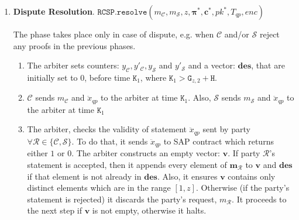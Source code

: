 \begin{enumerate}
\begin{enumerate}
\end{enumerate}

\

\item \textbf{Dispute Resolution}.\label{RCSP::Dispute-Resolution} $\mathtt{RCSP}.\mathtt{resolve}(m_{\scriptscriptstyle \mathcal{C}},m_{\scriptscriptstyle \mathcal{S}},z, {\bm{\pi}}^{\scriptscriptstyle *}, {\bm{c}}^{\scriptscriptstyle *},pk^{\scriptscriptstyle*}, T_{\scriptscriptstyle qp},enc)$



 The phase takes place only in  case of dispute, e.g. when $\mathcal C$ and/or $\mathcal S$ reject any proofs in the previous phases. %

\begin{enumerate}


\item The arbiter sets  counters: $y_{\scriptscriptstyle\mathcal C}, y'_{\scriptscriptstyle\mathcal C},y_{\scriptscriptstyle\mathcal S}$ and  $y'_{\scriptscriptstyle\mathcal S}$ and a vector: $\bm{des}$, that are initially set to $0$,  before time $\texttt{K}_{\scriptscriptstyle 1}$,  where $\texttt{K}_{\scriptscriptstyle 1}>\texttt{G}_{\scriptscriptstyle z,2}+\texttt{H}$. 
\item $\mathcal C$  sends $m_{\scriptscriptstyle\mathcal C}$ and $\ddot{x}_{\scriptscriptstyle qp}$ to the arbiter at time $\texttt{K}_{\scriptscriptstyle 1}$. Also,  $\mathcal S$ sends $m_{\scriptscriptstyle\mathcal S}$ and $\ddot{x}_{\scriptscriptstyle qp}$ to the arbiter at time $\texttt{K}_{\scriptscriptstyle 1}$ %



\item\label{arbiter-checks-statement} The arbiter, checks the validity of  statement $\ddot{x}_{\scriptscriptstyle qp}$ sent by party  $\forall \mathcal R\in \{\mathcal {C,S}\}$. To do that, it sends  $\ddot{x}_{\scriptscriptstyle qp}$ to SAP contract which  returns  either $1$ or $0$. The arbiter  constructs an empty vector: $\bm{v}$.  If  party $\mathcal R$'s statement is accepted, then 
 it appends every  element of $\bm{m}_{\scriptscriptstyle\mathcal{R}}$ to $\bm{v}$ and $\bm{des}$  if that element is not already in $\bm{des}$. Also, it ensures $\bm{v}$ contains only distinct elements which are in the range $[1,z]$. Otherwise (if the party's statement is rejected) it discards the party's request, ${m}_{\scriptscriptstyle\mathcal{R}}$. It proceeds to the next step if $\bm{v}$ is not empty, otherwise it halts. 


\end{enumerate}
\end{enumerate}

